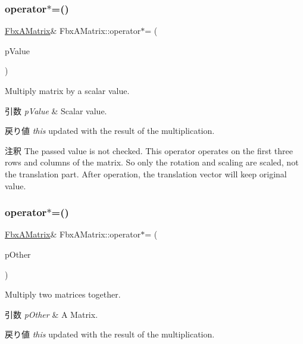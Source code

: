 \subsubsection{\texorpdfstring{operator$\ast$=()}{operator*=()}\hspace{0.1cm}{\footnotesize\ttfamily [1/2]}}
{\footnotesize\ttfamily \hyperlink{class_fbx_a_matrix}{Fbx\+A\+Matrix}\& Fbx\+A\+Matrix\+::operator$\ast$= (\begin{DoxyParamCaption}\item[{\hyperlink{class_fbx_a_matrix_ad463edbb9fea344643297701f159faa7}{double}}]{p\+Value }\end{DoxyParamCaption})}

Multiply matrix by a scalar value. 
\begin{DoxyParams}{引数}
{\em p\+Value} & Scalar value. \\
\hline
\end{DoxyParams}
\begin{DoxyReturn}{戻り値}
{\itshape this} updated with the result of the multiplication. 
\end{DoxyReturn}
\begin{DoxyRemark}{注釈}
The passed value is not checked. This operator operates on the first three rows and columns of the matrix. So only the rotation and scaling are scaled, not the translation part. After operation, the translation vector will keep original value. 
\end{DoxyRemark}
\mbox{\label{class_fbx_a_matrix_a8eba4c43ccc466bebfc555c9170bf3e5}} 
\subsubsection{\texorpdfstring{operator$\ast$=()}{operator*=()}\hspace{0.1cm}{\footnotesize\ttfamily [2/2]}}
{\footnotesize\ttfamily \hyperlink{class_fbx_a_matrix}{Fbx\+A\+Matrix}\& Fbx\+A\+Matrix\+::operator$\ast$= (\begin{DoxyParamCaption}\item[{const \hyperlink{class_fbx_a_matrix}{Fbx\+A\+Matrix} \&}]{p\+Other }\end{DoxyParamCaption})}

Multiply two matrices together. 
\begin{DoxyParams}{引数}
{\em p\+Other} & A Matrix. \\
\hline
\end{DoxyParams}
\begin{DoxyReturn}{戻り値}
{\itshape this} updated with the result of the multiplication. 
\end{DoxyReturn}
\mbox{\label{class_fbx_a_matrix_a8f8ab0b3698f9d25b3051c5928315ef6}} 

